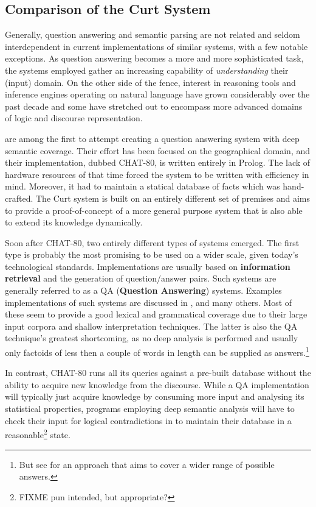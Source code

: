 \documentclass[11pt,a4paper]{article}
\newcommand{\abbr}{\textsf} %
\newcommand{\term}[1]{\textsf{\textbf{#1}}} %
\newcommand{\pn}{\textsf} %
\newcommand{\curt}{\pn{Curt}}
\newcommand{\prol}{\pn{Prolog}}
\theoremstyle{remark}
\theoremstyle{remark}
\theoremstyle{definition}
\begin{document}
\subsection{Comparison of the Curt System}\label{sec:comparison}

Generally, question answering and semantic parsing are not related and seldom
interdependent in current implementations of similar systems, with a few notable
exceptions. As question answering becomes a more and more sophisticated task,
the systems employed gather an increasing capability of \emph{understanding}
their (input) domain. On the other side of the fence, interest in reasoning
tools and inference engines operating on natural language have grown
considerably over the past decade and some have stretched out to encompass more
advanced domains of logic and discourse representation.

\cite{chat} are among  the first to attempt creating a question answering system
with deep semantic coverage. Their effort has been focused on the geographical
domain, and their implementation, dubbed \pn{CHAT-80}, is written entirely in
\prol. The lack of hardware resources of that time forced the system to be
written with efficiency in mind. Moreover, it had to maintain a statical
database of facts which was hand-crafted. The \curt{} system is built on  an
entirely different set of premises and aims to provide a proof-of-concept of a
more general purpose system that is also able to extend its knowledge
dynamically.

Soon after \pn{CHAT-80}, two entirely different types of systems emerged. The
first type is probably the most promising to be used on a wider scale, given
today's technological standards. Implementations are usually based on
\term{information retrieval} and the generation of question/answer pairs. Such
systems are generally referred to as a \abbr{QA} (\term{Question Answering})
systems.  Examples implementations of such systems are discussed in \cite{rama},
\cite{iesqa} and many others. Most of these seem to provide a good lexical and
grammatical coverage due to their large input corpora and
shallow interpretation techniques. The latter is also the \abbr{QA} technique's
greatest shortcoming, as no deep analysis is  performed and usually
only factoids of less then a couple of words in length can be supplied as
answers.\footnote{But see \cite{aqabtf} for an approach that aims to cover a
wider range of possible answers.}

In contrast, \pn{CHAT-80} runs all its queries against a pre-built database
without the ability to acquire new knowledge from the discourse. While a
\abbr{QA} implementation will typically just acquire knowledge by consuming
more input and analysing its statistical properties, programs employing deep
semantic analysis will have to check their input for logical contradictions in
to maintain their database in a reasonable\footnote{FIXME pun intended, but
appropriate? %
} state.
\end{document}
